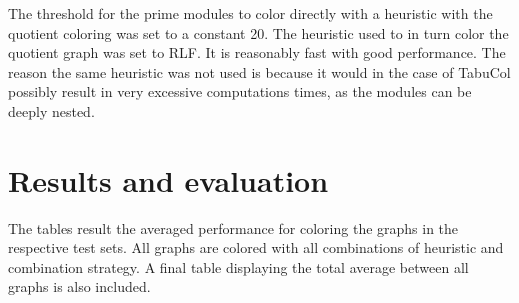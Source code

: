 \documentclass{amsart}
\begin{document}
The threshold for the prime modules to color directly with a heuristic with
the quotient coloring was set to a constant 20. The heuristic used to in turn
color the quotient graph was set to RLF. It is reasonably fast with good
performance. The reason the same heuristic was not used is because it would in
the case of TabuCol possibly result in very excessive computations times, as the 
modules can be deeply nested.

\section{Results and evaluation}
\label{sec:Result}
The tables result the averaged performance for coloring the graphs in the
respective test sets. All graphs are colored with all combinations of heuristic
and combination strategy. A final table displaying the total average between all
graphs is also included.

\end{document}
